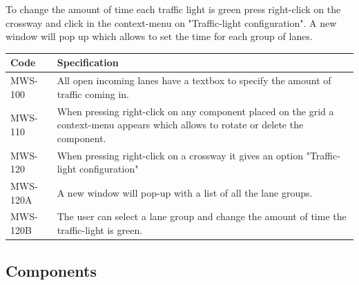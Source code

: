To change the amount of time each traffic light is green press right-click on the crossway and click in the context-menu on "Traffic-light configuration". A new window will pop up which allows to set the time for each group of lanes.

\begin{tabularx}{\textwidth}{|p{2cm}X|}\hline
	Code & Specification \\\hline
	MWS-100 & All open incoming lanes have a textbox to specify the amount of traffic coming in.\\\hline
	MWS-110 & When pressing right-click on any component placed on the grid a context-menu appears which allows to rotate or delete the component.\\\hline
	MWS-120 & When pressing right-click on a crossway it gives an option "Traffic-light configuration"\\\hline
	MWS-120A & A new window will pop-up with a list of all the lane groups.\\\hline
	MWS-120B & The user can select a lane group and change the amount of time the traffic-light is green.\\\hline
\end{tabularx}

\newpage
\subsection{Components}
\label{sec:components}

